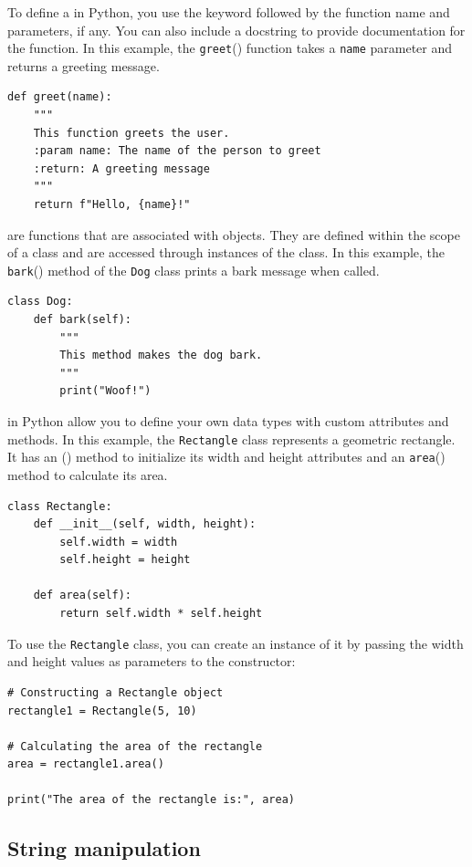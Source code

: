To define a  in Python, you use the  keyword followed by the function name and parameters, if any. You can also include a docstring to provide documentation for the function. In this example, the \texttt{greet}() function takes a \texttt{name} parameter and returns a greeting message.
\begin{lstlisting}
def greet(name):
    """
    This function greets the user.
    :param name: The name of the person to greet
    :return: A greeting message
    """
    return f"Hello, {name}!"
\end{lstlisting}


 are functions that are associated with objects. They are defined within the scope of a class and are accessed through instances of the class. In this example, the \texttt{bark}() method of the \texttt{Dog} class prints a bark message when called.
\begin{lstlisting}
class Dog:
    def bark(self):
        """
        This method makes the dog bark.
        """
        print("Woof!")
\end{lstlisting}

 in Python allow you to define your own data types with custom attributes and methods. In this example, the \texttt{Rectangle} class represents a geometric rectangle. It has an () method to initialize its width and height attributes and an \texttt{area}() method to calculate its area.
\begin{lstlisting}
class Rectangle:
    def __init__(self, width, height):
        self.width = width
        self.height = height
        
    def area(self):
        return self.width * self.height
\end{lstlisting}

To use the \texttt{Rectangle} class, you can create an instance of it by passing the width and height values as parameters to the constructor:
\begin{lstlisting}
# Constructing a Rectangle object
rectangle1 = Rectangle(5, 10)

# Calculating the area of the rectangle
area = rectangle1.area()

print("The area of the rectangle is:", area)
\end{lstlisting}








\subsection{String manipulation}

